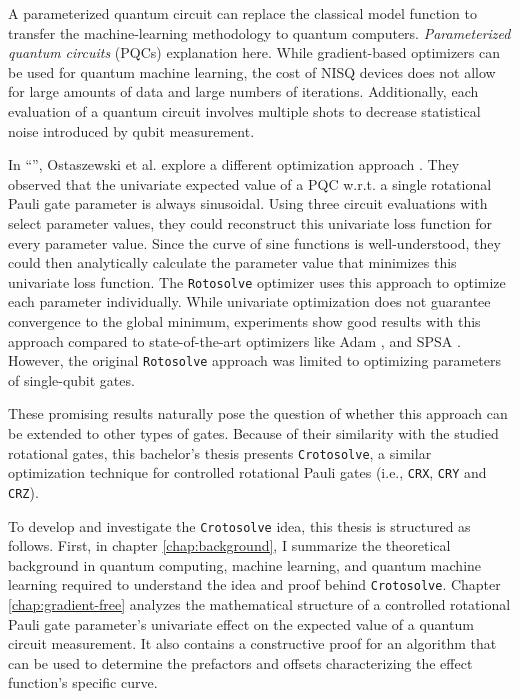 A parameterized quantum circuit can replace the classical model function to
transfer the machine-learning methodology to quantum computers.
\emph{Parameterized quantum circuits} (PQCs) explanation here. %
While gradient-based optimizers can be used for quantum machine learning,
the cost of NISQ devices does not allow for large amounts of data and large
numbers of iterations.
Additionally, each evaluation of a quantum circuit involves multiple shots to
decrease statistical noise introduced by qubit measurement.

In ``\emph{}'', Ostaszewski et al.
explore a different optimization approach \cite{ostaszewski_structure_2021}.
They observed that the univariate expected value of a PQC w.r.t. a single
rotational Pauli gate parameter is always sinusoidal.
Using three circuit evaluations with select parameter values, they could
reconstruct this univariate loss function for every parameter value.
Since the curve of sine functions is well-understood, they could then
analytically calculate the parameter value that minimizes this univariate loss
function.
The \texttt{Rotosolve} optimizer uses this approach to optimize each parameter
individually.
While univariate optimization does not guarantee convergence to the global
minimum, experiments show good results with this approach compared to
state-of-the-art optimizers like Adam \cite{kingma_adam_2017}, and SPSA
\cite{spall_multivariate_1992}.
However, the original \texttt{Rotosolve} approach was limited to optimizing
parameters of single-qubit gates.

These promising results naturally pose the question of whether this approach can
be extended to other types of gates.
Because of their similarity with the studied rotational gates, this bachelor's
thesis presents \texttt{Crotosolve}, a similar optimization technique for
controlled rotational Pauli gates (i.e., \texttt{CRX}, \texttt{CRY} and
\texttt{CRZ}).

To develop and investigate the \texttt{Crotosolve} idea, this thesis is
structured as follows.
First, in chapter \ref{chap:background}, I summarize the theoretical background
in quantum computing, machine learning, and quantum machine learning required to
understand the idea and proof behind \texttt{Crotosolve}.
Chapter \ref{chap:gradient-free} analyzes the mathematical structure of a
controlled rotational Pauli gate parameter's univariate effect on the
expected value of a quantum circuit measurement.
It also contains a constructive proof for an algorithm that can be used to
determine the prefactors and offsets characterizing the effect function's
specific curve.

